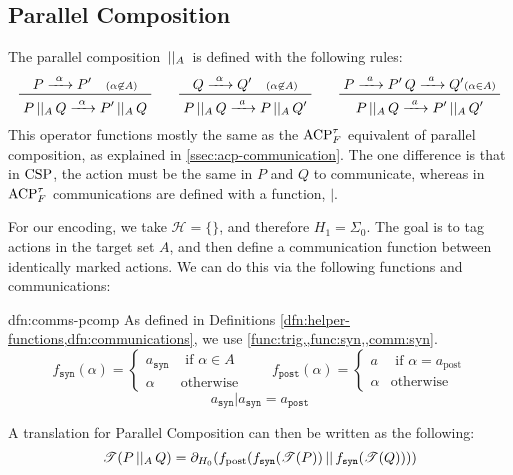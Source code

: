 \documentclass[../hons_project.tex]{subfiles}
\begin{document}
\subsection{Parallel Composition}\label{ssec:parallel-composition}
The parallel composition $\,\vert\vert_{A}\,$ is defined with the following rules:
\begin{equation}\label{eq:pcomp-definition}
	\prftree{P \prightarrow{\alpha} P' \quad \scriptstyle(\alpha\not\in A)}{P \pcomp Q \prightarrow{\alpha} P'\pcomp Q} \qquad \prftree{Q \prightarrow{\alpha} Q' \quad \scriptstyle(\alpha\not\in A) }{P \pcomp Q \prightarrow{a} P\pcomp Q'}\qquad \prftree{P \prightarrow{a} P' \, Q \prightarrow{a} Q'\scriptstyle(\alpha\in A)}{P \pcomp Q \prightarrow{a} P' \pcomp Q'}
\end{equation}
This operator functions mostly the same as the $\mathrm{ACP}_{F}^{\tau}$ equivalent of parallel composition, as explained in \cref{ssec:acp-communication}. The one difference is that in $\mathrm{CSP}$, the action must be the same in $P$ and $Q$ to communicate, whereas in $\mathrm{ACP}_{F}^{\tau}$ communications are defined with a function, $\mid$.

For our encoding, we take $\mathscr{H} = \{\}$, and therefore $H_{1} = \Sigma_{0}$. The goal is to tag actions in the target set $A$, and then define a communication function between identically marked actions. We can do this via the following functions and communications:

\begin{dfn}{dfn:comms-pcomp}{}
	As defined in Definitions \cref{dfn:helper-functions,dfn:communications}, we use \cref{func:trig,,func:syn,,comm:syn}.
	\[f_{\mathtt{syn}}(\alpha) = \begin{cases}
			a_{\mathtt{syn}} & \text{ if } \alpha\in A \\
			\alpha           & \text{otherwise}
		\end{cases} \qquad f_{\mathtt{post}}(\alpha) = \begin{cases}
			a      & \text{ if } \alpha = a_{\mathrm{post}} \\
			\alpha & \text{otherwise}
		\end{cases}\]
	\[a_{\mathtt{syn}} | a_{\mathtt{syn}} = a_{\mathtt{post}}\]
\end{dfn}


A translation for Parallel Composition can then be written as the following:
\[\mathscr{T}(P \,\vert\vert_{A}\, Q) = \partial_{H_{0}}(f_{\mathrm{post}}(f_{\mathtt{syn}}(\mathscr{T}(P)) \,\vert\vert\, f_{\mathtt{syn}}(\mathscr{T}(Q)))) \]
\end{document}
